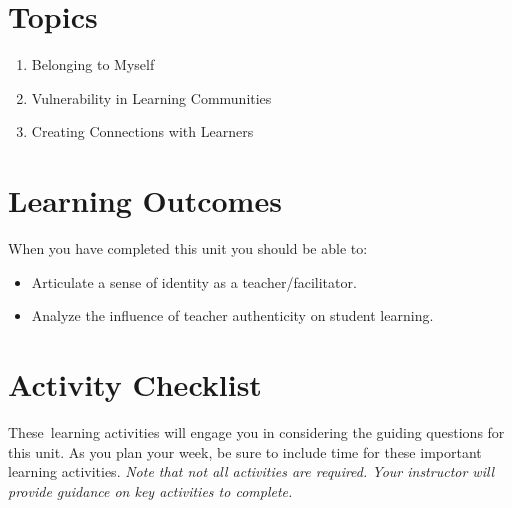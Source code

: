 \documentclass[
]{book}
\providecommand{\tightlist}{%
  \setlength{\itemsep}{0pt}\setlength{\parskip}{0pt}}
\begin{document}
\hypertarget{topics-1}{%
\section*{Topics}\label{topics-1}}

\begin{enumerate}
\def\labelenumi{\arabic{enumi}.}
\tightlist
\item
  Belonging to Myself
\item
  Vulnerability in Learning Communities
\item
  Creating Connections with Learners
\end{enumerate}

\hypertarget{learning-outcomes-1}{%
\section*{Learning Outcomes}\label{learning-outcomes-1}}

When you have completed this unit you should be able to:

\begin{itemize}
\item
  Articulate a sense of identity as a teacher/facilitator.
\item
  Analyze the influence of teacher authenticity on student learning.
\end{itemize}

\hypertarget{activity-checklist-1}{%
\section*{Activity Checklist}\label{activity-checklist-1}}

These~learning activities will engage you in considering the guiding questions for this unit. As you plan your week, be sure to include time for these important learning activities. \emph{Note that not all activities are required. Your instructor will provide guidance on key activities to complete.}
\end{document}
